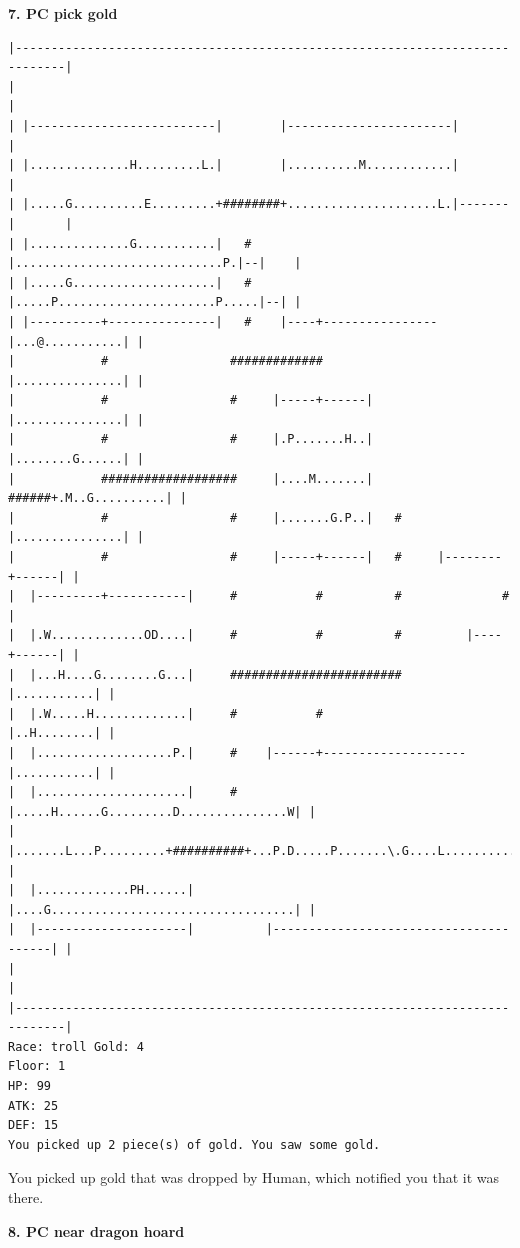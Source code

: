 \documentclass[11pt]{article}
\theoremstyle{plain}
\begin{document}
\newpage
\textbf{7. PC pick gold}
\begin{Verbatim}[fontsize=\scriptsize]
|-----------------------------------------------------------------------------|
|                                                                             |
| |--------------------------|        |-----------------------|               |
| |..............H.........L.|        |..........M............|               |
| |.....G..........E.........+########+.....................L.|-------|       |
| |..............G...........|   #    |.............................P.|--|    |
| |.....G....................|   #    |.....P......................P.....|--| |
| |----------+---------------|   #    |----+----------------|...@...........| |
|            #                 #############                |...............| |
|            #                 #     |-----+------|         |...............| |
|            #                 #     |.P.......H..|         |........G......| |
|            ###################     |....M.......|   ######+.M..G..........| |
|            #                 #     |.......G.P..|   #     |...............| |
|            #                 #     |-----+------|   #     |--------+------| |
|  |---------+-----------|     #           #          #              #        |
|  |.W.............OD....|     #           #          #         |----+------| |
|  |...H....G........G...|     ########################         |...........| |
|  |.W.....H.............|     #           #                    |..H........| |
|  |...................P.|     #    |------+--------------------|...........| |
|  |.....................|     #    |.....H......G.........D...............W| |
|  |.......L...P.........+##########+...P.D.....P.......\.G....L............| |
|  |.............PH......|          |....G..................................| |
|  |---------------------|          |---------------------------------------| |
|                                                                             |
|-----------------------------------------------------------------------------|
Race: troll Gold: 4                                                    Floor: 1
HP: 99
ATK: 25
DEF: 15
You picked up 2 piece(s) of gold. You saw some gold. 
\end{Verbatim}

You picked up gold that was dropped by Human, which notified you that
it was there.



\newpage
\textbf{8. PC near dragon hoard}
\end{document}
